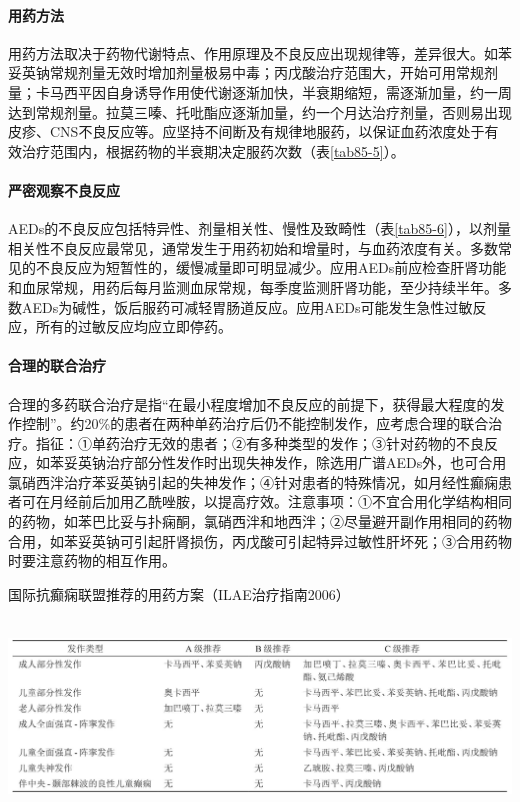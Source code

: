 \paragraph{用药方法}

用药方法取决于药物代谢特点、作用原理及不良反应出现规律等，差异很大。如苯妥英钠常规剂量无效时增加剂量极易中毒；丙戊酸治疗范围大，开始可用常规剂量；卡马西平因自身诱导作用使代谢逐渐加快，半衰期缩短，需逐渐加量，约一周达到常规剂量。拉莫三嗪、托吡酯应逐渐加量，约一个月达治疗剂量，否则易出现皮疹、CNS不良反应等。应坚持不间断及有规律地服药，以保证血药浓度处于有效治疗范围内，根据药物的半衰期决定服药次数（表\ref{tab85-5}）。

\paragraph{严密观察不良反应}

AEDs的不良反应包括特异性、剂量相关性、慢性及致畸性（表\ref{tab85-6}），以剂量相关性不良反应最常见，通常发生于用药初始和增量时，与血药浓度有关。多数常见的不良反应为短暂性的，缓慢减量即可明显减少。应用AEDs前应检查肝肾功能和血尿常规，用药后每月监测血尿常规，每季度监测肝肾功能，至少持续半年。多数AEDs为碱性，饭后服药可减轻胃肠道反应。应用AEDs可能发生急性过敏反应，所有的过敏反应均应立即停药。

\paragraph{合理的联合治疗}

合理的多药联合治疗是指“在最小程度增加不良反应的前提下，获得最大程度的发作控制”。约20\%的患者在两种单药治疗后仍不能控制发作，应考虑合理的联合治疗。指征：①单药治疗无效的患者；②有多种类型的发作；③针对药物的不良反应，如苯妥英钠治疗部分性发作时出现失神发作，除选用广谱AEDs外，也可合用氯硝西泮治疗苯妥英钠引起的失神发作；④针对患者的特殊情况，如月经性癫痫患者可在月经前后加用乙酰唑胺，以提高疗效。注意事项：①不宜合用化学结构相同的药物，如苯巴比妥与扑痫酮，氯硝西泮和地西泮；②尽量避开副作用相同的药物合用，如苯妥英钠可引起肝肾损伤，丙戊酸可引起特异过敏性肝坏死；③合用药物时要注意药物的相互作用。

\begin{table}[htbp]
\centering
\caption{国际抗癫痫联盟推荐的用药方案（ILAE治疗指南2006）}
\label{tab85-4}
\includegraphics[width=6.57292in,height=2.03125in]{./images/Image00387.jpg}
\end{table}

